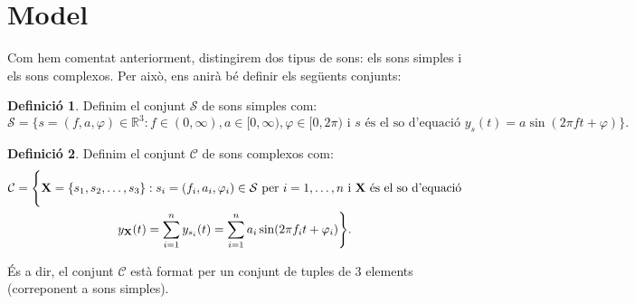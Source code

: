 \documentclass{article}
\theoremstyle{definition}
\newtheorem{definition}{Definició}[section]
\newcommand{\0}{\ensuremath{\vb{0}}}
\newcommand{\X}{\ensuremath{\vb{X}}}
\newcommand{\Y}{\ensuremath{\vb{Y}}}
\newcommand{\RR}{\ensuremath{\mathbb{R}}} %
\begin{document}
\section{Model}
Com hem comentat anteriorment, distingirem dos tipus de sons: els sons simples i els sons complexos. Per això, ens anirà bé definir els següents conjunts:
\begin{definition}
    Definim el conjunt $\mathcal{S}$ de sons simples com: $$\mathcal{S}=\{s=(f,a,\varphi)\in\RR^3:f\in(0,\infty),a\in[0,\infty),\varphi\in[0,2\pi)\text{ i $s$ és el so d'equació }y_s(t)=a\sin(2\pi ft+\varphi)\}.$$
\end{definition}
\begin{definition}
    Definim el conjunt $\mathcal{C}$ de sons complexos com:
    \begin{multline*}
        \mathcal{C}=\Bigg\{\X=\{s_1,s_2,\ldots,s_3\}:s_i=(f_i,a_i,\varphi_i)\in\mathcal{S}\text{ per } i=1,\ldots,n\text{ i $\X$ és el so d'equació}\\y_{\X}(t)=\sum_{i=1}^ny_{s_i}(t)=\sum_{i=1}^na_i\sin(2\pi f_it+\varphi_i)\Bigg\}.
    \end{multline*}
\end{definition}
És a dir, el conjunt $\mathcal{C}$ està format per un conjunt de tuples de 3 elements (correponent a sons simples).\par
\end{document}

